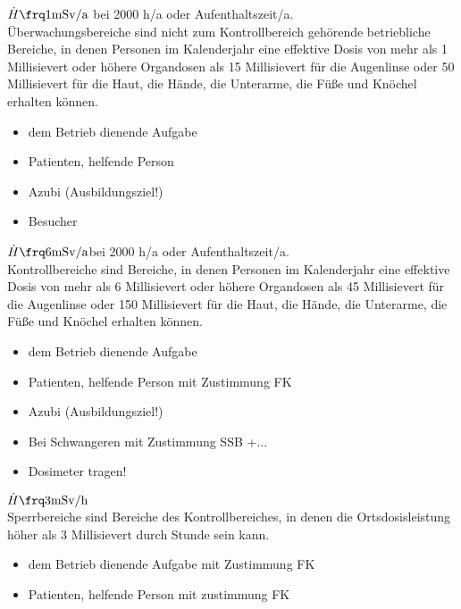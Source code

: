 \documentclass[12pt,a4paper,one side]{article}%
\begin{document}
\begin{description}
\parbox{\textwidth}{%
\item[Überwachungsbereich:] $\dot{H} \frq 1\rm mSv/a$ bei 2000 h/a oder Aufenthaltszeit/a.\\
Überwachungsbereiche sind nicht zum Kontrollbereich gehörende betriebliche Bereiche, in denen Personen im Kalenderjahr eine effektive Dosis von mehr als 1 Millisievert oder höhere Organdosen als 15 Millisievert für die Augenlinse oder 50 Millisievert für die Haut, die Hände, die Unterarme, die Füße und Knöchel erhalten können.
\begin{itemize}
\itemsep0pt
\item dem Betrieb dienende Aufgabe
\item Patienten, helfende Person
\item Azubi (Ausbildungsziel!)
\item Besucher
\end{itemize}
}%

\parbox{\textwidth}{%
\item[Kontrollbereich:] $\dot{H} \frq 6\rm mSv/a$bei 2000 h/a oder Aufenthaltszeit/a.\\
Kontrollbereiche sind Bereiche, in denen Personen im Kalenderjahr eine effektive Dosis von mehr als 6 Millisievert oder höhere Organdosen als 45 Millisievert für die Augenlinse oder 150 Millisievert für die Haut, die Hände, die Unterarme, die Füße und Knöchel erhalten können.
\begin{itemize}
\itemsep0pt
\item dem Betrieb dienende Aufgabe
\item Patienten, helfende Person mit Zustimmung FK
\item Azubi (Ausbildungsziel!)
\item Bei Schwangeren mit Zustimmung SSB +...
\item Dosimeter tragen!
\end{itemize}
}%

\parbox{\textwidth}{%
\item[Sperrbereich:] $\dot{H} \frq 3\rm mSv/h$\\
Sperrbereiche sind Bereiche des Kontrollbereiches, in denen die Ortsdosisleistung höher als 3 Millisievert durch Stunde sein kann.\\
\begin{itemize}
\itemsep0pt
\item dem Betrieb dienende Aufgabe mit Zustimmung FK
\item Patienten, helfende Person mit zustimmung FK
\end{itemize}
}%
\end{description}
\end{document}
